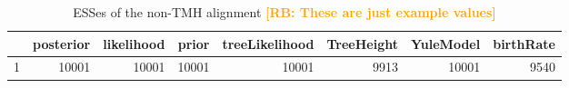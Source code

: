 \documentclass{article}
\newcommand{\richel}[1]{\textcolor{orange}{\textbf{[RB: #1]}}}
\begin{document}
\begin{table}[ht]
\centering
\begin{tabular}{rrrrrrrr}
  \hline
 & posterior & likelihood & prior & treeLikelihood & TreeHeight & YuleModel & birthRate \\ 
  \hline
1 & 10001 & 10001 & 10001 & 10001 & 9913 & 10001 & 9540 \\ 
   \hline
\end{tabular}
\caption{
  ESSes of the non-TMH alignment
  \richel{These are just example values}
} 
\label{tab:esses_non_tmh}
\end{table}
\end{document}
